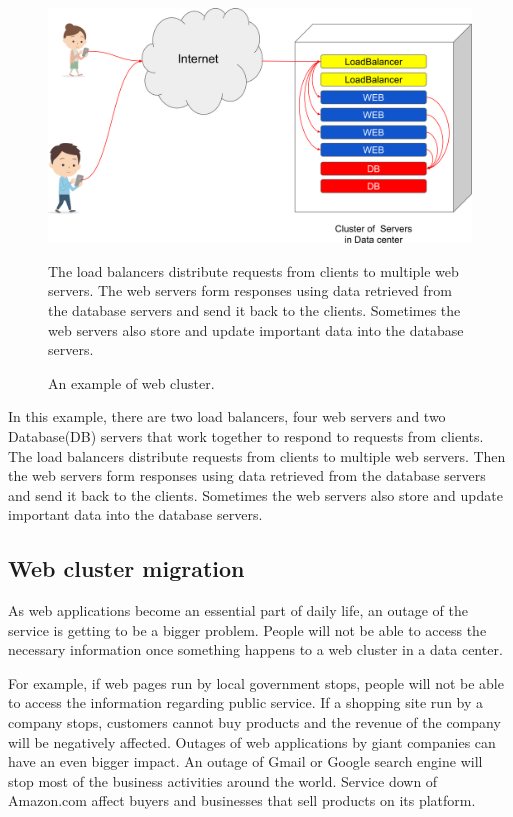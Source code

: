 \begin{figure}[h]
\begin{center}
\includegraphics[width=0.8\columnwidth]{Figs/web_cluster.png}
\end{center}
\caption{
An example of web cluster.
}
\centering\parbox[c]{0.9\columnwidth}{
The load balancers distribute requests from clients to multiple web servers.
The web servers form responses using data retrieved from the database servers and send it back to the clients.
Sometimes the web servers also store and update important data into the database servers.
}
\label{fig:web_cluster}
\end{figure}

In this example, there are two load balancers, four web servers and two Database(DB) servers that work together to respond to requests from clients.
The load balancers distribute requests from clients to multiple web servers.
Then the web servers form responses using data retrieved from the database servers and send it back to the clients.
Sometimes the web servers also store and update important data into the database servers.

\subsection{Web cluster migration}

As web applications become an essential part of daily life, an outage of the service is getting to be a bigger problem.
People will not be able to access the necessary information once something happens to a web cluster in a data center.

For example, if web pages run by local government stops, people will not be able to access the information regarding public service.
If a shopping site run by a company stops, customers cannot buy products and the revenue of the company will be negatively affected.
Outages of web applications by giant companies can have an even bigger impact.
An outage of Gmail or Google search engine will stop most of the business activities around the world.
Service down of Amazon.com affect buyers and businesses that sell products on its platform.

